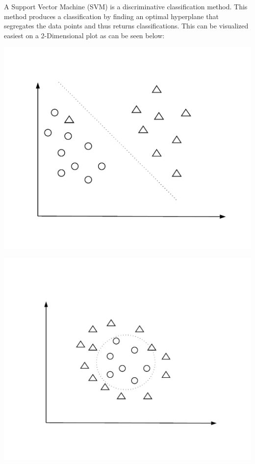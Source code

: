 \documentclass[11pt, a4paper]{article}
\begin{document}
A Support Vector Machine (SVM) is a discriminative classification method. This method produces a classification by finding an optimal hyperplane that segregates the data points and thus returns classifications. This can be visualized easiest on a 2-Dimensional plot as can be seen below:
\begin{center}
\begin{minipage}[]{0.45\textwidth}
\includegraphics[scale=0.15]{svm}
\caption{•}
\end{minipage}
\hspace{0.5 cm}
\begin{minipage}[]{0.45\textwidth}
\includegraphics[scale=0.15]{svm_kernel}
\end{minipage}
\end{center}


\newpage


\end{document}
